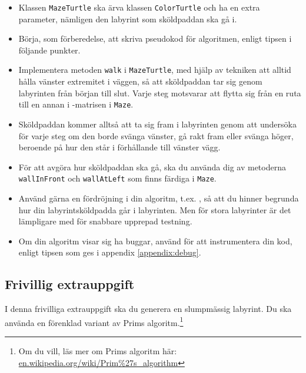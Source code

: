 \begin{itemize}
\item Klassen \texttt{MazeTurtle} ska ärva klassen \texttt{ColorTurtle} och ha en extra parameter, nämligen den labyrint som sköldpaddan ska gå i. 

\item Börja, som förberedelse, att skriva pseudokod för algoritmen, enligt tipsen i följande punkter.

\item Implementera metoden \texttt{walk} i \texttt{MazeTurtle}, med hjälp av tekniken att alltid hålla vänster extremitet i väggen, så att sköldpaddan tar sig genom labyrinten från början till slut. Varje steg motsvarar att flytta sig från en ruta till en annan i -matrisen i \texttt{Maze}. 

\item Sköldpaddan kommer alltså att ta sig fram i labyrinten genom att undersöka för varje steg om den borde svänga vänster, gå rakt fram eller svänga höger, beroende på hur den står i förhållande till vänster vägg. 

\item För att avgöra hur sköldpaddan ska gå, ska du använda dig av metoderna \texttt{wallInFront} och \texttt{wallAtLeft} som finns färdiga i \texttt{Maze}. 

\item Använd gärna en fördröjning i din algoritm, t.ex. , så att du hinner begrunda hur din labyrintsköldpadda går i labyrinten. Men för stora labyrinter är det lämpligare med  för snabbare upprepad testning. 

\item Om din algoritm visar sig ha buggar, använd  för att instrumentera din kod, enligt tipsen som ges i appendix \ref{appendix:debug}.

\end{itemize}

\clearpage

\subsection{Frivillig extrauppgift}

I denna frivilliga extrauppgift ska du generera en slumpmässig labyrint. Du ska använda en förenklad variant av Prims algoritm.\footnote{Om du vill, läs mer om Prims algoritm här: \href{https://en.wikipedia.org/wiki/Prim\%27s_algorithm}{en.wikipedia.org/wiki/Prim\%27s\_algorithm}}

